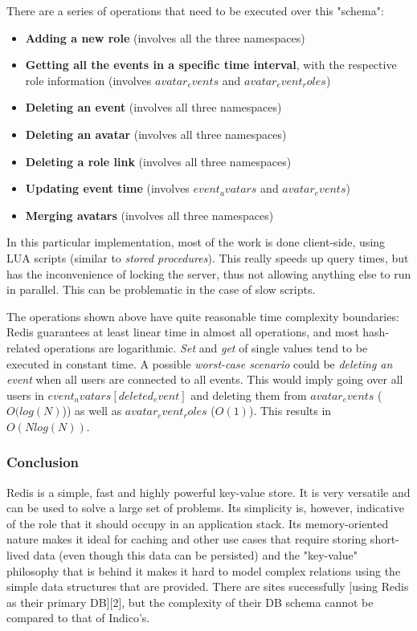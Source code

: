 There are a series of operations that need to be executed over this "schema":

\begin{itemize}
  \item \textbf{Adding a new role} (involves all the three namespaces)
  \item \textbf{Getting all the events in a specific time interval}, with the respective role information (involves $avatar_events$ and $avatar_event_roles$)
  \item \textbf{Deleting an event} (involves all three namespaces)
  \item \textbf{Deleting an avatar} (involves all three namespaces)
  \item \textbf{Deleting a role link} (involves all three namespaces)
  \item \textbf{Updating event time} (involves $event_avatars$ and $avatar_events$)
  \item \textbf{Merging avatars} (involves all three namespaces)
\end{itemize}
In this particular implementation, most of the work is done client-side, using LUA scripts (similar to \textit{stored procedures}). This really speeds up query times, but has the inconvenience of locking the server, thus not allowing anything else to run in parallel. This can be problematic in the case of slow scripts.

The operations shown above have quite reasonable time complexity boundaries: Redis guarantees at least linear time in almost all operations, and most hash-related operations are logarithmic. \textit{Set} and \textit{get} of single values tend to be executed in constant time. A possible \textit{worst-case scenario} could be \textit{deleting an event} when all users are connected to all events. This would imply going over all users in $event_avatars[deleted_event]$ and deleting them from $avatar_events$ ($O(log(N)$)) as well as $avatar_event_roles$ ($O(1)$). This results in $O(Nlog(N))$.

\subsubsection{Conclusion}

Redis is a simple, fast and highly powerful key-value store. It is very versatile and can be used to solve a large set of problems. Its simplicity is, however, indicative of the role that it should occupy in an application stack. Its memory-oriented nature makes it ideal for caching and other use cases that require storing short-lived data (even though this data can be persisted) and the "key-value" philosophy that is behind it makes it hard to model complex relations using the simple data structures that are provided. There are sites successfully [using Redis as their primary DB][2], but the complexity of their DB schema cannot be compared to that of Indico's.

